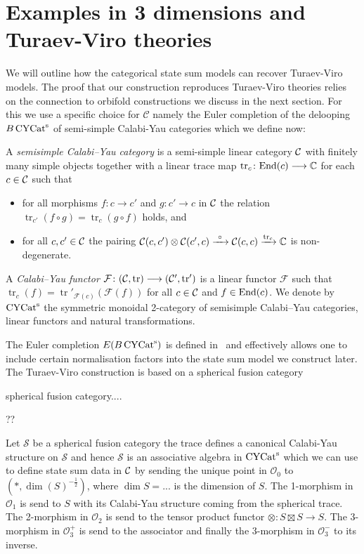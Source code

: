 \section{Examples in 3 dimensions and Turaev-Viro theories}\label{sec:3D}
We will outline how the categorical state sum models can recover Turaev-Viro models. The proof that our construction reproduces Turaev-Viro theories relies on the connection to orbifold constructions we discuss in the next section. 
For this we use a specific choice for $\mathcal{C}$ namely the Euler completion of the delooping $B\operatorname{\mathrm{CYCat}^s}$ of semi-simple Calabi-Yau categories which we define now:

\begin{definition}
	A \emph{semisimple Calabi--Yau category} is a semi-simple linear category $\mathcal{C}$ with finitely many simple objects together with a linear 
	trace map $\operatorname{tr}_c \colon \mathrm{End} (c) \longrightarrow \mathbb{C}$ for each $c\in \mathcal{C}$ such that  
	\begin{itemize}
		\item 
		for all morphisms $f\colon c \longrightarrow c'$ and $g\colon c' \longrightarrow c$ in $\mathcal{C}$ the relation $\operatorname{tr}_{c'}(f\circ g)= \operatorname{tr}_c({g\circ f})$ holds, and
		\item 
		for all $c,c'\in \mathcal{C}$ the pairing $\mathcal{C}(c,c') \otimes \mathcal{C}(c',c) \xrightarrow{\  \circ  \ } \mathcal{C}(c,c) \xrightarrow{\operatorname{tr}_c} \mathbb{C}$ is non-degenerate. 
	\end{itemize}
	A \emph{Calabi--Yau functor} $\mathcal{F} \colon (\mathcal{C}, \operatorname{tr}) \longrightarrow (\mathcal{C}' , \operatorname{tr}')$ is a linear functor $\mathcal{F}$ such that $\operatorname{tr}_c(f)= \operatorname{tr}'_{\mathcal{F}(c)}(\mathcal{F}(f)) $ for all $c\in \mathcal{C}$ and $f\in \mathrm{End}(c)$. We denote by 
	$\operatorname{\mathrm{CYCat}^s}$ the symmetric monoidal 2-category of semisimple Calabi--Yau categories, linear functors and natural transformations.
\end{definition} 

The Euler completion $E(B\operatorname{\mathrm{CYCat}^s})$ is defined in~\cite{3DOrb} and effectively allows one to include certain normalisation factors into the state sum model we construct later. 
The Turaev-Viro construction is based on a spherical fusion category
\begin{definition}
    spherical fusion category....
\end{definition}
\begin{example}
    ??
\end{example}
Let $\mathcal{S}$ be a spherical fusion category the trace defines a canonical Calabi-Yau structure on $\mathcal{S}$ and hence $\mathcal{S}$ is an associative algebra in $\operatorname{\mathrm{CYCat}^s}$ which we can use to define state sum data in $\mathcal{C}$ by sending the unique point in $\mathcal{O}_0$ to $(*,\dim (S)^{-\tfrac{1}{2}})$, where $\dim S = ...$ is the dimension of $S$. The 1-morphism in $\mathcal{O}_1$ is send to $S$ with its Calabi-Yau structure coming from the spherical trace. The 2-morphism in $\mathcal{O}_2$ is send to the tensor product functor $\otimes \colon S\boxtimes S \to S$. The 3-morphism in $\mathcal{O}_3^+$ is send to the associator and finally the 3-morphism in $\mathcal{O}_3^-$ to its inverse. 